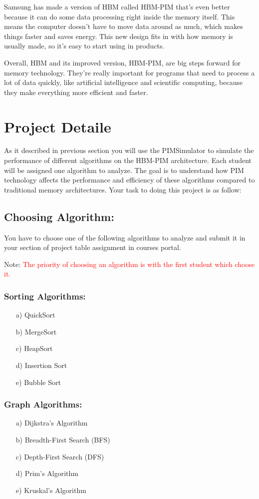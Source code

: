 \documentclass[12pt]{article}
\begin{document}
Samsung has made a version of HBM called HBM-PIM that's even better because it can do some data processing right inside the memory itself. This means the computer doesn't have to move data around as much, which makes things faster and saves energy. This new design fits in with how memory is usually made, so it's easy to start using in products.

Overall, HBM and its improved version, HBM-PIM, are big steps forward for memory technology. They're really important for programs that need to process a lot of data quickly, like artificial intelligence and scientific computing, because they make everything more efficient and faster.



\section{Project Detaile}
As it described in previous section you will use the PIMSimulator to simulate the performance of different algorithms on the HBM-PIM architecture. Each student will be assigned one algorithm to analyze. The goal is to understand how PIM technology affects the performance and efficiency of these algorithms compared to traditional memory architectures. Your task to doing this project is as follow:

\subsection{Choosing Algorithm:}
You have to choose one of the following algorithms to analyze and submit it in your section of project table assignment in courses portal.

Note: \textcolor{red}{The priority of choosing an algorithm is with the first student which choose it.}


\subsubsection{Sorting Algorithms:}
\begin{enumerate}
	\item[a)] QuickSort
	\item[b)] MergeSort
	\item[c)] HeapSort
	\item[d)] Insertion Sort
	\item[e)] Bubble Sort
\end{enumerate}

\subsubsection{Graph Algorithms:}
\begin{enumerate}
	\item[a)] Dijkstra's Algorithm
	\item[b)] Breadth-First Search (BFS)
	\item[c)] Depth-First Search (DFS)
	\item[d)] Prim's Algorithm
	\item[e)] Kruskal's Algorithm
\end{enumerate}
\end{document}
